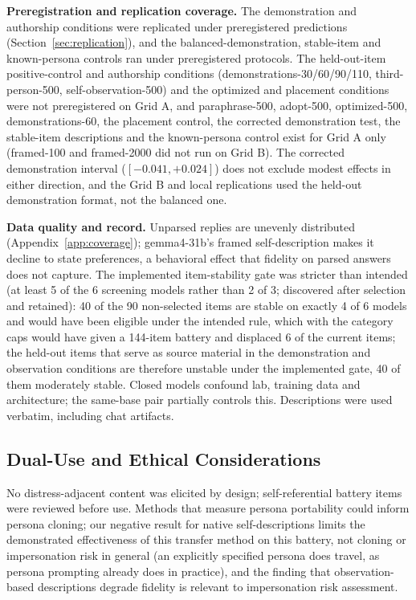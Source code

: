 \documentclass[11pt]{article}
\begin{document}
\textbf{Preregistration and replication coverage.} The demonstration and
authorship conditions were replicated under preregistered predictions
(Section~\ref{sec:replication}), and the balanced-demonstration, stable-item
and known-persona controls ran under preregistered protocols. The
held-out-item positive-control and authorship
conditions (demonstrations-30/60/90/110, third-person-500,
self-observation-500) and the optimized and placement conditions were not
preregistered on Grid A, and paraphrase-500, adopt-500, optimized-500,
demonstrations-60, the placement control, the corrected demonstration test,
the stable-item descriptions and the known-persona control exist for Grid A
only (framed-100 and framed-2000 did not run on Grid B). The corrected demonstration interval
($[-0.041, +0.024]$) does not exclude modest effects in either direction,
and the Grid B and local replications used the held-out demonstration
format, not the balanced one.

\textbf{Data quality and record.} Unparsed replies are unevenly distributed
(Appendix~\ref{app:coverage}); gemma4-31b's framed self-description makes it
decline to state preferences, a behavioral effect that fidelity on parsed
answers does not capture. The implemented item-stability gate was stricter
than intended (at least 5 of the 6 screening models rather than 2 of 3;
discovered after selection and retained): 40 of the 90 non-selected items
are stable on exactly 4 of 6 models and would have been eligible under the
intended rule, which with the category caps would have given a 144-item
battery and displaced 6 of the current items; the held-out items that serve
as source material in the demonstration and observation conditions are
therefore unstable under the implemented gate, 40 of them moderately
stable. Closed models confound lab, training data and architecture; the
same-base pair partially controls this. Descriptions were used verbatim,
including chat artifacts.

\subsection*{Dual-Use and Ethical Considerations}
No distress-adjacent content was elicited by design; self-referential
battery items were reviewed before use. Methods that measure persona
portability could inform persona cloning; our negative result for native
self-descriptions limits the demonstrated effectiveness of this transfer
method on this battery, not cloning or impersonation risk in general (an
explicitly specified persona does travel, as persona prompting already does
in practice), and the finding that
observation-based descriptions degrade fidelity is relevant to impersonation
risk assessment.
\end{document}
